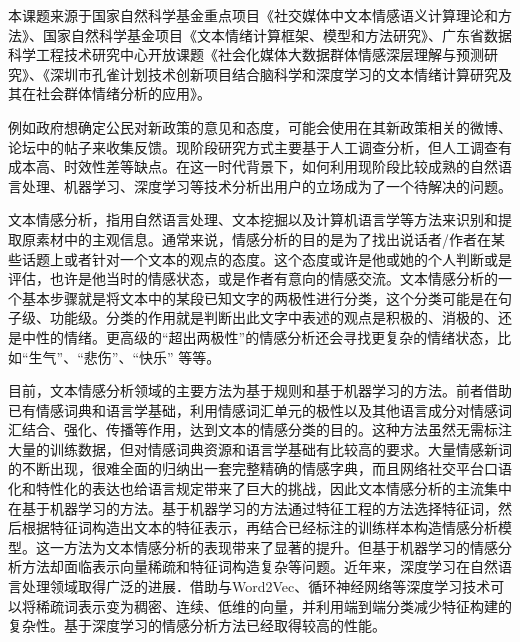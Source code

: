 


本课题来源于国家自然科学基金重点项目《社交媒体中文本情感语义计算理论和方法》、国家自然科学基金项目《文本情绪计算框架、模型和方法研究》、广东省数据科学工程技术研究中心开放课题《社会化媒体大数据群体情感深层理解与预测研究》、《深圳市孔雀计划技术创新项目结合脑科学和深度学习的文本情绪计算研究及其在社会群体情绪分析的应用》。



例如政府想确定公民对新政策的意见和态度，可能会使用在其新政策相关的微博、论坛中的帖子来收集反馈。现阶段研究方式主要基于人工调查分析，但人工调查有成本高、时效性差等缺点。在这一时代背景下，如何利用现阶段比较成熟的自然语言处理、机器学习、深度学习等技术分析出用户的立场成为了一个待解决的问题。

文本情感分析，指用自然语言处理、文本挖掘以及计算机语言学等方法来识别和提取原素材中的主观信息。通常来说，情感分析的目的是为了找出说话者/作者在某些话题上或者针对一个文本的观点的态度。这个态度或许是他或她的个人判断或是评估，也许是他当时的情感状态，或是作者有意向的情感交流。文本情感分析的一个基本步骤就是将文本中的某段已知文字的两极性进行分类，这个分类可能是在句子级、功能级。分类的作用就是判断出此文字中表述的观点是积极的、消极的、还是中性的情绪。更高级的“超出两极性”的情感分析还会寻找更复杂的情绪状态，比如“生气”、“悲伤”、“快乐” 等等。

目前，文本情感分析领域的主要方法为基于规则和基于机器学习的方法。前者借助已有情感词典和语言学基础，利用情感词汇单元的极性以及其他语言成分对情感词汇结合、强化、传播等作用，达到文本的情感分类的目的。这种方法虽然无需标注大量的训练数据，但对情感词典资源和语言学基础有比较高的要求。大量情感新词的不断出现，很难全面的归纳出一套完整精确的情感字典，而且网络社交平台口语化和特性化的表达也给语言规定带来了巨大的挑战，因此文本情感分析的主流集中在基于机器学习的方法。基于机器学习的方法通过特征工程的方法选择特征词，然后根据特征词构造出文本的特征表示，再结合已经标注的训练样本构造情感分析模型。这一方法为文本情感分析的表现带来了显著的提升。但基于机器学习的情感分析方法却面临表示向量稀疏和特征词构造复杂等问题。近年来，深度学习在自然语言处理领域取得广泛的进展．借助与Word2Vec\cite{mikolov2013efficient}、循环神经网络等深度学习技术可以将稀疏词表示变为稠密、连续、低维的向量，并利用端到端分类减少特征构建的复杂性。基于深度学习的情感分析方法已经取得较高的性能。

